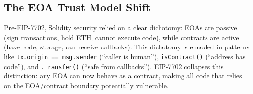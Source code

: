 \subsection{The EOA Trust Model Shift}

Pre-EIP-7702, Solidity security relied on a clear dichotomy: EOAs are passive (sign transactions, hold ETH, cannot execute code), while contracts are active (have code, storage, can receive callbacks). This dichotomy is encoded in patterns like \texttt{tx.origin == msg.sender} (``caller is human''), \texttt{isContract()} (``address has code''), and \texttt{.transfer()} (``safe from callbacks''). EIP-7702 collapses this distinction: any EOA can now behave as a contract, making all code that relies on the EOA/contract boundary potentially vulnerable.
